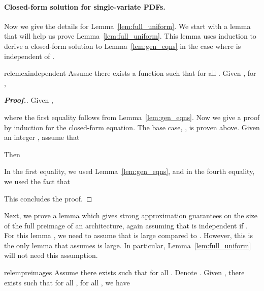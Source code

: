\documentclass[11pt]{article}
\numberwithin{equation}{section}
\numberwithin{figure}{section}
\theoremstyle{plain}
\theoremstyle{definition}
\begin{document}
\paragraph{Closed-form solution for single-variate PDFs.}
Now we give the details for Lemma~\ref{lem:full_uniform}.
We start with a lemma that will help us prove Lemma~\ref{lem:full_uniform}.
This lemma uses induction to derive a closed-form solution to
Lemma~\ref{lem:gen_eqns} in the case where  is independent of .


\begin{restatable}{relem}{exindependent}\label{lem:exindependent}
Assume there exists a function  such that  for all .
Given , for , 

\end{restatable}

\begin{proof}[\textbf{Proof.}]
Given , 

where the first equality follows from Lemma~\ref{lem:gen_eqns}.
Now we give a proof by induction for the closed-form equation.
The base case, , is proven above.
Given an integer , assume that

Then


In the first equality, we used Lemma~\ref{lem:gen_eqns}, and
in the fourth equality, we used the fact that


This concludes the proof.
\end{proof}

Next, we prove a lemma which gives strong approximation guarantees
on the size of the full preimage of an architecture, again assuming
that  is independent if .
For this lemma , we need to assume that  is large compared to .
However, this is the only lemma that assumes  is large. In particular,
Lemma~\ref{lem:full_uniform} will not need this assumption.

\begin{restatable}{relem}{preimages}\label{lem:preimages}
Assume there exists  such that  for all .
Denote .
Given , there exists  such that for all ,
for all , we have

\end{restatable}
\end{document}
